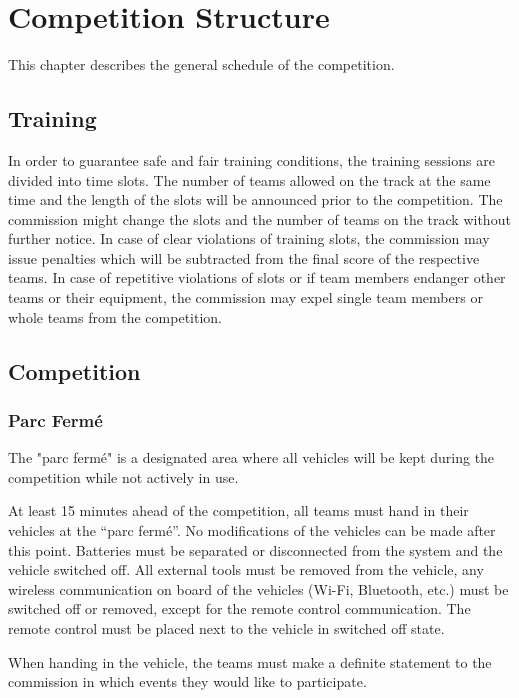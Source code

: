 \chapter{Competition Structure}

This chapter describes the general schedule of the competition.

\section{Training}

In order to guarantee safe and fair training conditions, the training sessions are divided into time slots.
The number of teams allowed on the track at the same time and the length of the slots will be announced prior to the competition.
The commission might change the slots and the number of teams on the track without further notice.
In case of clear violations of training slots, the commission may issue penalties which will be subtracted from the final score of the respective teams.
In case of repetitive violations of slots or if team members endanger other teams or their equipment, the commission may expel single team members or whole teams from the competition.

\section{Competition}

\subsection{Parc Fermé}

The "parc fermé" is a designated area where all vehicles will be kept during the competition while not actively in use.

At least 15 minutes ahead of the competition, all teams must hand in their vehicles at the “parc fermé”.
No modifications of the vehicles can be made after this point.
Batteries must be separated or disconnected from the system and the vehicle switched off.
All external tools must be removed from the vehicle, any wireless communication on board of the vehicles (Wi-Fi, Bluetooth, etc.) must be switched off or removed, except for the remote control communication.
The remote control must be placed next to the vehicle in switched off state.

When handing in the vehicle, the teams must make a definite statement to the commission in which events they would like to participate.

